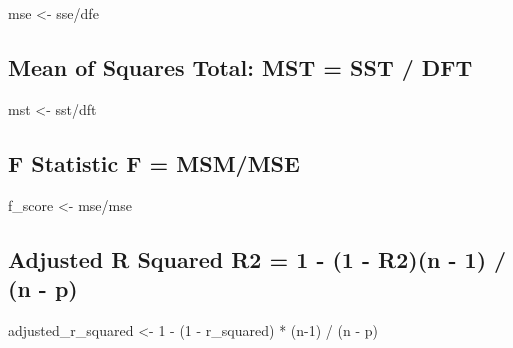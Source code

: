 \documentclass[
]{article}
\newenvironment{Shaded}{\begin{snugshade}}{\end{snugshade}}
\newcommand{\DecValTok}[1]{\textcolor[rgb]{0.00,0.00,0.81}{#1}}
\newcommand{\NormalTok}[1]{#1}
\newcommand{\OtherTok}[1]{\textcolor[rgb]{0.56,0.35,0.01}{#1}}
\newcommand{\SpecialCharTok}[1]{\textcolor[rgb]{0.00,0.00,0.00}{#1}}
\begin{document}
\begin{Shaded}
\begin{Highlighting}[]
\NormalTok{mse }\OtherTok{\textless{}{-}}\NormalTok{ sse}\SpecialCharTok{/}\NormalTok{dfe}
\end{Highlighting}
\end{Shaded}

\hypertarget{mean-of-squares-total-mst-sst-dft}{%
\subsection{Mean of Squares Total: MST = SST /
DFT}\label{mean-of-squares-total-mst-sst-dft}}

\begin{Shaded}
\begin{Highlighting}[]
\NormalTok{mst }\OtherTok{\textless{}{-}}\NormalTok{ sst}\SpecialCharTok{/}\NormalTok{dft}
\end{Highlighting}
\end{Shaded}

\hypertarget{f-statistic-f-msmmse}{%
\subsection{F Statistic F = MSM/MSE}\label{f-statistic-f-msmmse}}

\begin{Shaded}
\begin{Highlighting}[]
\NormalTok{f\_score }\OtherTok{\textless{}{-}}\NormalTok{ mse}\SpecialCharTok{/}\NormalTok{mse}
\end{Highlighting}
\end{Shaded}

\hypertarget{adjusted-r-squared-r2-1---1---r2n---1-n---p}{%
\subsection{Adjusted R Squared R2 = 1 - (1 - R2)(n - 1) / (n -
p)}\label{adjusted-r-squared-r2-1---1---r2n---1-n---p}}

\begin{Shaded}
\begin{Highlighting}[]
\NormalTok{adjusted\_r\_squared }\OtherTok{\textless{}{-}} \DecValTok{1} \SpecialCharTok{{-}}\NormalTok{ (}\DecValTok{1} \SpecialCharTok{{-}}\NormalTok{ r\_squared) }\SpecialCharTok{*}\NormalTok{ (n}\DecValTok{{-}1}\NormalTok{) }\SpecialCharTok{/}\NormalTok{ (n }\SpecialCharTok{{-}}\NormalTok{ p)}
\end{Highlighting}
\end{Shaded}
\end{document}
